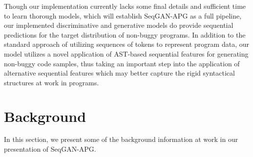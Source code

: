 \documentclass[sigconf]{acmart}
\begin{document}
Though our implementation currently lacks some final details and sufficient time to learn thorough models, which will establish SeqGAN-APG as a full pipeline, our implemented discriminative and generative models do provide sequential predictions for the target distribution of non-buggy programs. In addition to the standard approach of utilizing sequences of tokens to represent program data, our model utilizes a novel application of AST-based sequential features for generating non-buggy code samples, thus taking an important step into the application of alternative sequential features which may better capture the rigid syntactical structures at work in programs. 

\section{Background}
\label{sec:background}
In this section, we present some of the background information at work in our presentation of SeqGAN-APG. 
\end{document}
